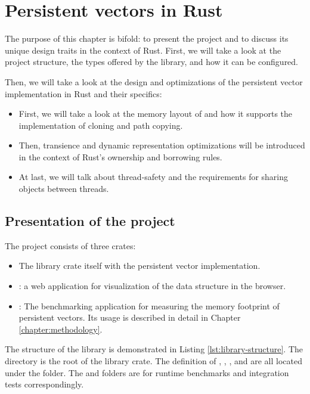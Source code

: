 \chapter{Persistent vectors in Rust}
\label{chapter:persistent-vectors-in-rust}

The purpose of this chapter is bifold: to present the \pvecrs{} project and to discuss its unique design traits in the context of Rust. First, we will take a look at the project structure, the types offered by the library, and how it can be configured.

Then, we will take a look at the design and optimizations of the persistent vector implementation in Rust and their specifics:

\begin{itemize}
    \item First, we will take a look at the memory layout of \rrbtree{} and how it supports the implementation of cloning and path copying.
    \item Then, transience and dynamic representation optimizations will be introduced in the context of Rust's ownership and borrowing rules.
    \item At last, we will talk about thread-safety and the requirements for sharing objects between threads.
\end{itemize}

\section{Presentation of the project}
The \pvecrs{} project consists of three crates:
\begin{itemize}
    \item The library crate itself with the persistent vector implementation.
    \item {}: a web application for visualization of the data structure in the browser.
    \item {}: The benchmarking application for measuring the memory footprint of persistent vectors. Its usage is described in detail in Chapter \ref{chapter:methodology}.
\end{itemize}

The structure of the library is demonstrated in Listing \ref{lst:library-structure}. The  directory is the root of the library crate. The definition of \rrbtree{}, \rbvec{}, \rrbvec{}, and \pvec{} are all located under the  folder. The  and  folders are for runtime benchmarks and integration tests correspondingly.

